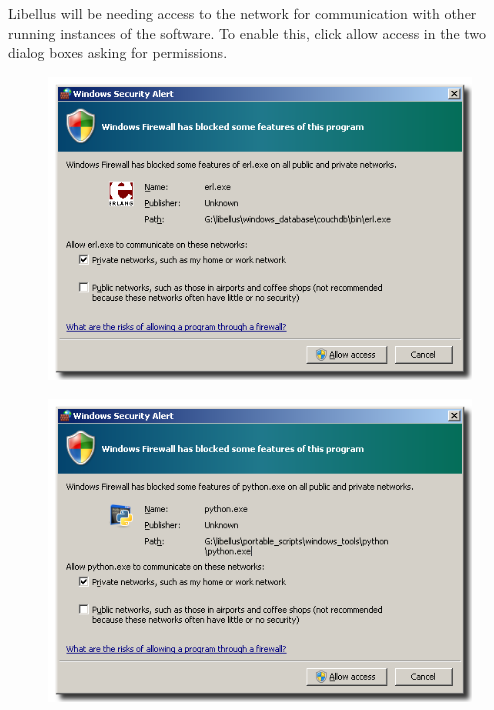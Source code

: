 \documentclass[letterpaper,10pt,english]{sphinxmanual}
\begin{document}
Libellus will be needing access to the network for communication with other running instances of the software. To enable this, click allow access in the two dialog boxes asking for permissions.
\begin{figure}[htbp]
\centering

\includegraphics{fw_erl.png}
\end{figure}
\begin{figure}[htbp]
\centering

\includegraphics{fw_python.png}
\end{figure}
\end{document}
